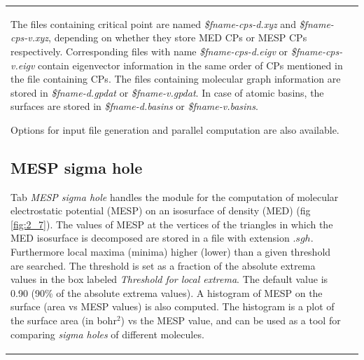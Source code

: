 \documentclass[10pt]{article}
\begin{document}
\vspace*{5mm}
\begin{tabular}{lr}
\hspace*{-3mm}
\begin{minipage}{.6\linewidth}

The files containing critical point are named {\it \$fname-cps-d.xyz} and {\it \$fname-cps-v.xyz}, depending on whether they store
MED CPs or MESP CPs respectively. Corresponding files with name {\it \$fname-cps-d.eigv} or {\it \$fname-cps-v.eigv} 
contain eigenvector information in the same order of CPs mentioned in the file containing CPs. The files containing molecular 
graph 
information are stored in {\it \$fname-d.gpdat} or {\it \$fname-v.gpdat}. 
In case of atomic basins, the surfaces 
are stored in {\it \$fname-d.basins} or {\it \$fname-v.basins}.

Options for input file generation and parallel computation are also available.

\subsection{MESP sigma hole \label{sec:2.7}\index{MESP sigma hole}}

Tab {\it MESP sigma hole} handles the module for the computation of
molecular electrostatic potential (MESP) on an isosurface of density (MED) (fig \ref{fig:2_7}). 
The values of MESP at the vertices of the triangles 
in which the MED isosurface is decomposed are stored in a file with extension $.sgh$. 
Furthermore local maxima (minima) higher (lower) than a given threshold are searched. The 
threshold is set as a fraction of the absolute extrema values in the box labeled {\it Threshold 
for local extrema}. The default value is 0.90 (90\% of the absolute extrema values). 
A histogram\index{MESP sigma hole!histogram} of 
MESP on the surface (area vs MESP values) is also computed. 
The histogram is a plot of the surface area (in bohr$^2$) vs the MESP value, and can be used as a tool for comparing {\it sigma holes}
of different molecules. 


\end{minipage}
\end{tabular}
\end{document}
